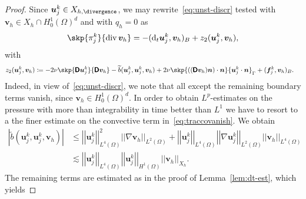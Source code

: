 \documentclass[reqno,a4paper]{amsart}
\def\abs#1{\left| #1 \right|}
\def\norm#1{\left|\!\left| #1 \right|\!\right|}
\def\tens#1{\pmb{\mathsf{#1}}}
\def\vec#1{\boldsymbol{#1}}
\def\diver{\mathop{\mathrm{div}}\nolimits} %
\def\d{{\rm d}}
\def\difft{\d_t}
\def\bf{\vec{f}}
\def\bn{\vec{n}}
\def\bu{\vec{u}}
\def\bv{\vec{v}}
\def\BD{\tens{D}}
\def\vz{{z_2}}
\begin{document}
\begin{proof}
	
Since $\bu^k_j \in X_{h,\divergence}$, we may rewrite~\eqref{eq:unst-discr} tested with $\bv_h \in X_h \cap H^1_0(\Omega) ^d$ and with $q_h = 0$ as
	\begin{align}\label{eq:est-press-1}
		\skp{ \pi_j^{k}}{ \diver \bv_h } 
		= -
		(\difft {\bu}^{k}_j,{\bv}_h)_B + z_2( \bu^k_j,\bv_h),
	\end{align}
	with
 \begin{equation}
		\begin{aligned}\label{def:z-form-2}
			\vz(\bu^k_j, \bv_h) &\coloneqq 
			- 2\nu \skp{ \BD \bu^{k}_j}{ \BD \bv_h } 
			- \widetilde{b}(\bu^{k}_j, \bu^{k}_j, \bv_h)
			+ 2 \nu \skp{   \left(( \BD \bv_h) \bn \right) \cdot \bn }{ \bu_j^{k} \cdot \bn }_{\Gamma}
			+ ({\bf}_j^{k} ,\bv_h )_B. 
		\end{aligned}
	\end{equation}
	Indeed, in view of~\eqref{eq:unst-discr}, we note that all except the  remaining boundary terms vanish, since $\bv_h  \in H^1_0(\Omega)^d$.
	In order to obtain $L^p$-estimates on the pressure with more than integrability  in time better than $L^1$ we have to resort to a the finer estimate on the convective term  in~\eqref{eq:traccovanish}. We obtain
	\begin{equation}\label{eq:est-press-2}
		\begin{aligned}
			\abs{ \widetilde b(\bu^k_j,\bu^k_j,\bv_h)}
			& \leq 
			\norm{\bu^k_j}_{L^4(\Omega)}^2
			\norm{\nabla \bv_h}_{L^2(\Omega)}
			+ \norm{\bu^k_j}_{L^4(\Omega)} 	
			\norm{\nabla \bu^k_j}_{L^2(\Omega)}
			\norm{\bv_h}_{L^4(\Omega)}\\
			& \lesssim 
			\norm{\bu^k_j}_{L^4(\Omega)} 	
			\norm{ \bu^k_j}_{H^1(\Omega)}
			\norm{ \bv_h}_{X_h}. 
		\end{aligned}
	\end{equation}
	The remaining terms are estimated as in the proof of Lemma~\ref{lem:dt-est}, which yields 
	

\end{proof}
\end{document}
